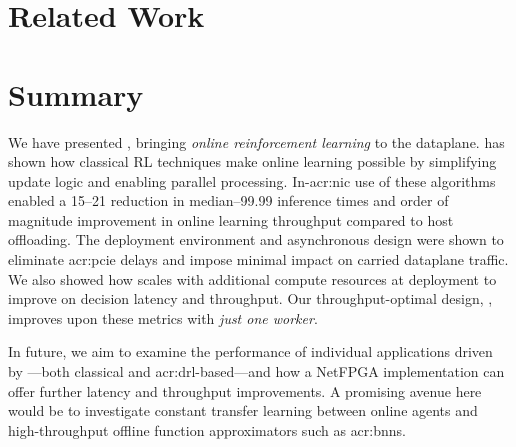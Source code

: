 \section{Related Work}


\section{Summary}\label{sec:opal-summary}
We have presented \emph{\approachshort{}}, bringing \emph{online reinforcement learning} to the dataplane.
\approachshort{} has shown how classical RL techniques make online learning possible by simplifying update logic and enabling parallel processing.
In-\gls{acr:nic} use of these algorithms enabled a \qtyrange{15}{21}{\times} reduction in median--\num{99.99} inference times and order of magnitude improvement in online learning throughput compared to host offloading.
The deployment environment and asynchronous design were shown to eliminate \gls{acr:pcie} delays and impose minimal impact on carried dataplane traffic.
We also showed how \approachshort{} scales with additional compute resources at deployment to improve on decision latency and throughput.
Our throughput-optimal design, \Indfw{}, improves upon these metrics with \emph{just one worker}.

In future, we aim to examine the performance of individual applications driven by \approachshort---both classical and \gls{acr:drl}-based---and how a NetFPGA implementation can offer further latency and throughput improvements.
A promising avenue here would be to investigate constant transfer learning between online \approachshort{} agents and high-throughput offline function approximators such as \glspl{acr:bnn}.
